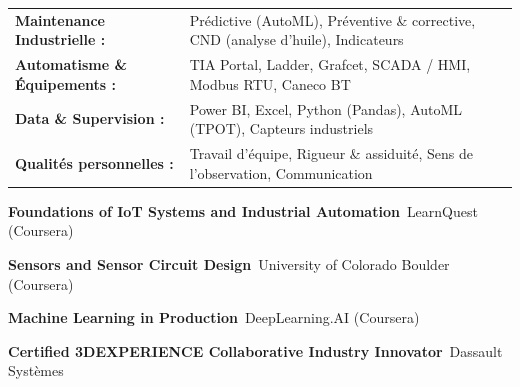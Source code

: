 \documentclass[10pt,a4paper]{../altacv}
\begin{document}
{\small
\begin{tabular}{@{}ll@{}}
\textbf{Maintenance Industrielle :} & Prédictive (AutoML), Préventive \& corrective, CND (analyse d’huile), Indicateurs \\[1.5pt]
\textbf{Automatisme \& Équipements :} & TIA Portal, Ladder, Grafcet, SCADA / HMI, Modbus RTU, Caneco BT \\[1.5pt]
\textbf{Data \& Supervision :} & Power BI, Excel, Python (Pandas), AutoML (TPOT), Capteurs industriels \\[1.5pt]
\textbf{Qualités personnelles :} & Travail d’équipe, Rigueur \& assiduité, Sens de l’observation, Communication
\end{tabular}
}

\begin{cvitems}
  \item \textbf{Foundations of IoT Systems and Industrial Automation}~\hfill {\color{emphasis}LearnQuest (Coursera)}
  \item \textbf{Sensors and Sensor Circuit Design}~\hfill {\color{emphasis}University of Colorado Boulder (Coursera)}
  \item \textbf{Machine Learning in Production}~\hfill {\color{emphasis}DeepLearning.AI (Coursera)}
  \item \textbf{Certified 3DEXPERIENCE Collaborative Industry Innovator}~\hfill {\color{emphasis}Dassault Systèmes}
\end{cvitems}

\cvactivites
\cvlangues
\end{document}
